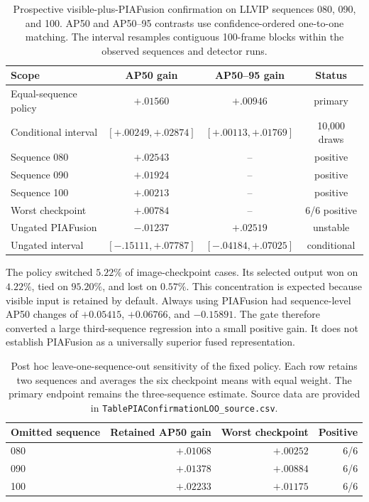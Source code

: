 \documentclass[11pt]{article}
\begin{document}
\begin{table}[ht]
\centering
\small
\setlength{\tabcolsep}{3pt}
\caption{Prospective visible-plus-PIAFusion confirmation on LLVIP sequences
080, 090, and 100. AP50 and AP50--95 contrasts use confidence-ordered
one-to-one matching. The interval resamples contiguous 100-frame blocks within
the observed sequences and detector runs.}
\label{tab:pia-prospective}
\begin{tabular}{@{}lccc@{}}
\toprule
Scope & AP50 gain & AP50--95 gain & Status \\
\midrule
Equal-sequence policy & \(+.01560\) & \(+.00946\) & primary \\
Conditional interval & \([+.00249,+.02874]\) & \([+.00113,+.01769]\) & 10,000 draws \\
Sequence 080 & \(+.02543\) & -- & positive \\
Sequence 090 & \(+.01924\) & -- & positive \\
Sequence 100 & \(+.00213\) & -- & positive \\
Worst checkpoint & \(+.00784\) & -- & 6/6 positive \\
Ungated PIAFusion & \(-.01237\) & \(+.02519\) & unstable \\
Ungated interval & \([-.15111,+.07787]\) & \([-.04184,+.07025]\) & conditional \\
\bottomrule
\end{tabular}
\end{table}

The policy switched \(5.22\%\) of image-checkpoint cases. Its selected output
won on \(4.22\%\), tied on \(95.20\%\), and lost on \(0.57\%\). This
concentration is expected because visible input is retained by default.
Always using PIAFusion had sequence-level AP50 changes of \(+0.05415\),
\(+0.06766\), and \(-0.15891\). The gate therefore converted a large
third-sequence regression into a small positive gain. It does not establish
PIAFusion as a universally superior fused representation.

\begin{table}[ht]
\centering
\small
\caption{Post hoc leave-one-sequence-out sensitivity of the fixed policy.
Each row retains two sequences and averages the six checkpoint means with
equal weight. The primary endpoint remains the three-sequence estimate. Source
data are provided in \texttt{TablePIAConfirmationLOO\_source.csv}.}
\label{tab:pia-leave-one-out}
\begin{tabular}{@{}lrrr@{}}
\toprule
Omitted sequence & Retained AP50 gain & Worst checkpoint & Positive \\
\midrule
080 & \(+.01068\) & \(+.00252\) & 6/6 \\
090 & \(+.01378\) & \(+.00884\) & 6/6 \\
100 & \(+.02233\) & \(+.01175\) & 6/6 \\
\bottomrule
\end{tabular}
\end{table}
\end{document}
